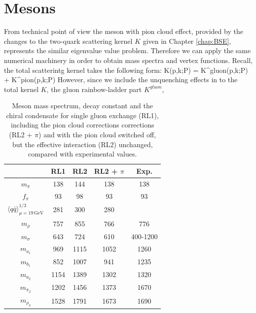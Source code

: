 \section{Mesons}
From technical point of view the meson \BSE with pion cloud effect, provided by the changes to the two-quark scattering kernel $K$
given in Chapter \ref{chap:BSE}, represents the similar eigenvalue value problem. Therefore we can apply the same numerical machinery 
in order to obtain mass spectra and \BS vertex functions. Recall, the total scatterintg kernel takes the following form:
\beqa
	K(p,k;P) = K^{gluon}(p,k;P) + K^{pion}(p,k;P)\;
\eeqa
However, since we include the unquenching effects in to the total kernel $K$, the gluon rainbow-ladder part $K^{gluon}$, 
\begin{table}[!h]
 \begin{center}
 \small
\renewcommand{\arraystretch}{1.2}
  \begin{tabular}[h]{c||c|c|c|c|}
\hline
\hline
  [MeV]  & RL1   & RL2      & RL2 + $\pi$ & Exp. \\ \hline\hline
 $m_\pi$ & 138	 & 144 & 138  & 138\\ 
 $f_\pi$ & 93	 & 98 & 93    & 93\\ 
 $\langle q\bar{q}\rangle^{1/3}_{\mu=19 \,\text{GeV}}$
        & 281  & 300 & 280  &   \\ \hline\hline
 $m_\rho$ & 757  & 855 & 766  & 776 \\
 $m_\sigma$& 643 & 724 & 610 & 400-1200 \\
 $m_{a_1}$ & 969 & 1115 & 1052 & 1260\\
 $m_{b_1}$ & 852 & 1007 & 941 & 1235\\
 $m_{a_2}$ & 1154 & 1389 & 1302 & 1320\\  
 $m_{\pi_2}$ & 1202 & 1456 & 1373 & 1670\\  
 $m_{\rho_3}$& 1528 & 1791 & 1673 & 1690\\  
 \hline\hline
\end{tabular}
\caption{Meson mass spectrum, decay constant and the chiral condensate for single gluon exchange (RL1), including the pion 
cloud corrections corrections (RL2 + $\pi$) and with the pion cloud switched off, but the effective interaction (RL2) unchanged, compared with experimental values.\label{tab:masses_mesons}}
 \end{center}
\end{table}
